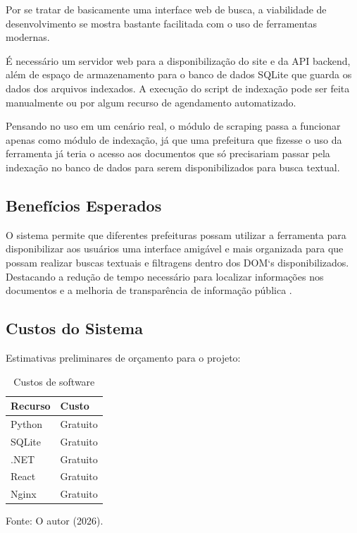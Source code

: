 Por se tratar de basicamente uma interface web de busca, a viabilidade de desenvolvimento se mostra bastante facilitada com o uso de ferramentas modernas.

É necessário um servidor web para a disponibilização do site e da API backend, além de espaço de armazenamento para o banco de dados SQLite que guarda os dados dos arquivos indexados. A execução do script de indexação pode ser feita manualmente ou por algum recurso de agendamento automatizado.

Pensando no uso em um cenário real, o módulo de scraping passa a funcionar apenas como módulo de indexação, já que uma prefeitura que fizesse o uso da ferramenta já teria o acesso aos documentos que só precisariam passar pela indexação no banco de dados para serem disponibilizados para busca textual.


\subsection{Benefícios Esperados}
O sistema permite que diferentes prefeituras possam utilizar a ferramenta para disponibilizar aos usuários uma interface amigável e mais organizada para que possam realizar buscas textuais e filtragens dentro dos DOM`s disponibilizados. Destacando a redução de tempo necessário para localizar informações nos documentos e a melhoria de transparência de informação pública .

\subsection{Custos do Sistema}
Estimativas preliminares de orçamento para o projeto:

\begin{table}[h]
    \centering
    \caption{Custos de software}
    \label{tab:custos_software}
    \begin{tabular}{ll}
        \hline
        Recurso & Custo \\ \hline
        Python & Gratuito \\
        SQLite & Gratuito \\
        .NET & Gratuito \\
        React & Gratuito \\ 
        Nginx & Gratuito \\ \hline
    \end{tabular}
\end{table}{\footnotesize Fonte: O autor (2026).}

